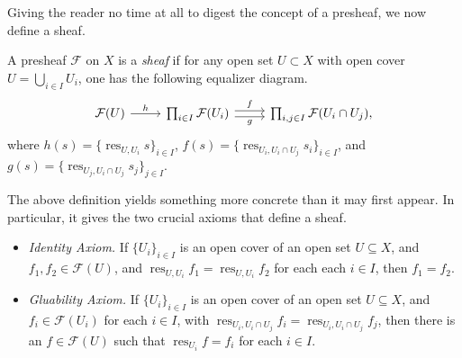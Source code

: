 \documentclass[11pt,openany]{book} %
\begin{document}
Giving the reader no time at all to digest the concept of a presheaf, we now define a sheaf.

\begin{definition}
A presheaf $\mathcal{F}$ on $X$ is a {\itshape sheaf} if for any open set $U \subset X$ with open cover $U = \bigcup_{i \in I} U_i$, one has the following equalizer diagram.
\[
\begin{tikzcd}
\mathcal{F}(U) \arrow[r, "h"] & \prod_{i \in I} \mathcal{F}(U_i) \arrow[r, shift left, "f"] \arrow[r, shift right, swap, "g"] & \prod_{i,j \in I} \mathcal{F}(U_i \cap U_j),
\end{tikzcd}
\]
where $h(s) = \{\operatorname{res}_{U,U_i} s\}_{i \in I}$, $f(s) = \{\operatorname{res}_{U_i,U_i \cap U_j} s_i\}_{i \in I}$, and $g(s) = \{\operatorname{res}_{U_j,U_i \cap U_j} s_j\}_{j \in I}$.
\end{definition}

The above definition yields something more concrete than it may first appear. In particular, it gives the two crucial axioms that define a sheaf.

\begin{itemize}
	\item \emph{Identity Axiom.} If $\{U_i\}_{i \in I}$ is an open cover of an open set $U \subseteq X$, and $f_1,f_2 \in \mathcal{F}(U)$, and $\operatorname{res}_{U,U_i} f_1 = \operatorname{res}_{U,U_i} f_2$ for each each $i \in I$, then $f_1 = f_2$.
    \item \emph{Gluability Axiom.} If $\{U_i\}_{i \in I}$ is an open cover of an open set $U \subseteq X$, and $f_i \in \mathcal{F}(U_i)$ for each $i \in I$, with $\operatorname{res}_{U_i,U_i \cap U_j} f_i = \operatorname{res}_{U_i,U_i \cap U_j} f_j$, then there is an $f \in \mathcal{F}(U)$ such that $\operatorname{res}_{U_i} f = f_i$ for each $i \in I$.
\end{itemize}
\hfill
\end{document}
